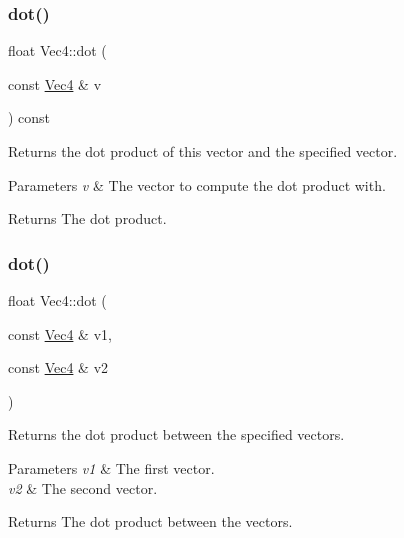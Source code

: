\subsubsection{\texorpdfstring{dot()}{dot()}\hspace{0.1cm}{\footnotesize\ttfamily [2/4]}}
{\footnotesize\ttfamily float Vec4\+::dot (\begin{DoxyParamCaption}\item[{const \hyperlink{classVec4}{Vec4} \&}]{v }\end{DoxyParamCaption}) const}

Returns the dot product of this vector and the specified vector.


\begin{DoxyParams}{Parameters}
{\em v} & The vector to compute the dot product with.\\
\hline
\end{DoxyParams}
\begin{DoxyReturn}{Returns}
The dot product. 
\end{DoxyReturn}
\mbox{\label{classVec4_a53674f90d78a84d1096a845a930f70ec}} 
\subsubsection{\texorpdfstring{dot()}{dot()}\hspace{0.1cm}{\footnotesize\ttfamily [3/4]}}
{\footnotesize\ttfamily float Vec4\+::dot (\begin{DoxyParamCaption}\item[{const \hyperlink{classVec4}{Vec4} \&}]{v1,  }\item[{const \hyperlink{classVec4}{Vec4} \&}]{v2 }\end{DoxyParamCaption})\hspace{0.3cm}{\ttfamily [static]}}

Returns the dot product between the specified vectors.


\begin{DoxyParams}{Parameters}
{\em v1} & The first vector. \\
\hline
{\em v2} & The second vector.\\
\hline
\end{DoxyParams}
\begin{DoxyReturn}{Returns}
The dot product between the vectors. 
\end{DoxyReturn}
\mbox{\label{classVec4_a351cd022fea2ae6af625001f532c1b2f}} 
